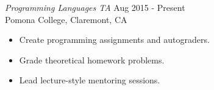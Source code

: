 {\sl Programming Languages TA} \hfill Aug 2015 - Present \\
Pomona College, Claremont, CA
\begin{itemize} \itemsep -2pt
  \item Create programming assignments and autograders.
  \item Grade theoretical homework problems.
  \item Lead lecture-style mentoring sessions.
\end{itemize}
